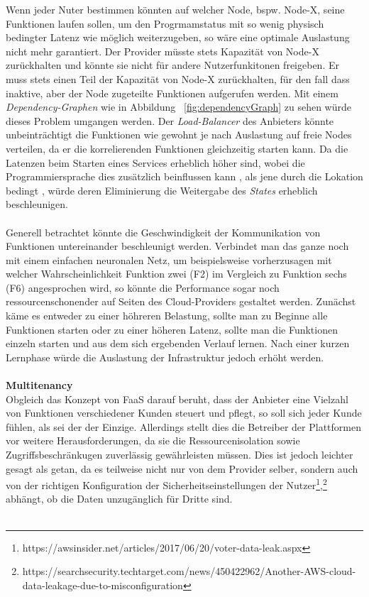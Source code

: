 \documentclass[11pt]{article}
\begin{document}
Wenn jeder Nuter bestimmen könnten auf welcher Node, bspw. Node-X, seine Funktionen laufen sollen, um den Progrmamstatus mit so wenig physisch bedingter Latenz wie möglich weiterzugeben, so wäre eine optimale Auslastung nicht mehr garantiert. Der Provider müsste stets Kapazität von Node-X zurückhalten und könnte sie nicht für andere Nutzerfunkitonen freigeben. Er muss stets einen Teil der Kapazität von Node-X zurückhalten, für den fall dass inaktive, aber der Node zugeteilte Funktionen aufgerufen werden. Mit einem \textit{Dependency-Graphen} wie in Abbildung ~\ref{fig:dependencyGraph} zu sehen würde dieses Problem umgangen werden. Der \textit{Load-Balancer} des Anbieters könnte unbeinträchtigt die Funktionen wie gewohnt je nach Auslastung auf freie Nodes verteilen, da er die korrelierenden Funktionen \glqq gleichzeitig\grqq{} starten kann. Da die Latenzen beim Starten eines Services erheblich höher sind, wobei die Programmiersprache dies zusätzlich beinflussen kann \cite{manner2018cold}, als jene durch die Lokation bedingt \cite{aditya2019will} \cite{jackson2018investigation}, würde deren Eliminierung die Weitergabe des \textit{States} erheblich beschleunigen. \\\\
Generell betrachtet könnte die Geschwindigkeit der Kommunikation von Funktionen untereinander beschleunigt werden. Verbindet man das ganze noch mit einem einfachen neuronalen Netz, um beispielsweise vorherzusagen mit welcher Wahrscheinlichkeit Funktion zwei (F2) im Vergleich zu Funktion sechs (F6) angesprochen wird, so könnte die Performance sogar noch ressourcenschonender auf Seiten des Cloud-Providers gestaltet werden. Zunächst käme es entweder zu einer höhreren Belastung, sollte man zu Beginne alle Funktionen starten oder zu einer höheren Latenz, sollte man die Funktionen einzeln starten und aus dem sich ergebenden Verlauf lernen. Nach einer kurzen Lernphase würde die Auslastung der Infrastruktur jedoch erhöht werden. \\\\
\glqq \textbf{Multitenancy}\grqq{}\\
Obgleich das Konzept von FaaS darauf beruht, dass der Anbieter eine Vielzahl von Funktionen verschiedener Kunden steuert und pflegt, so soll sich jeder Kunde fühlen, als sei der der Einzige. Allerdings stellt dies die Betreiber der Plattformen vor weitere Herausforderungen, da sie die Ressourcenisolation sowie Zugriffsbeschränkugen zuverlässig gewährleisten müssen. Dies ist jedoch leichter gesagt als getan, da es teilweise nicht nur von dem Provider selber, sondern auch von der richtigen Konfiguration der Sicherheitseinstellungen der Nutzer\footnote{https://awsinsider.net/articles/2017/06/20/voter-data-leak.aspx},\footnote{https://searchsecurity.techtarget.com/news/450422962/Another-AWS-cloud-data-leakage-due-to-misconfiguration} abhängt, ob die Daten unzugänglich für Dritte sind. \\\\
\end{document}
